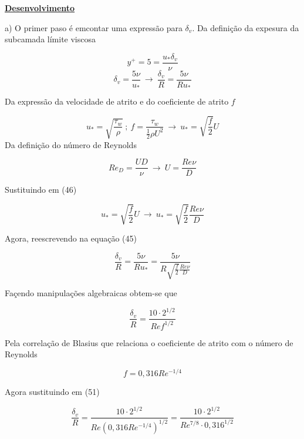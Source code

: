 \documentclass[12pt]{article}
\begin{document}
\textbf{\underline{Desenvolvimento}}

a) O primer paso é emcontar uma expressão para $\delta_v$. Da definição da expesura da subcamada límite viscosa

\begin{equation}
	y^+ = 5 = \frac{u_*\delta_v}{\nu}
\end{equation}
\begin{equation}
	\delta_v = \frac{5\nu}{u_*} \ \rightarrow \ \frac{\delta_v}{R} = \frac{5\nu}{Ru_*}
\end{equation}

Da expressão da velocidade de atrito e do coeficiente de atrito $f$

\begin{equation}
	u_*=\sqrt{\frac{\tau_w}{\rho}} \ ; \ f = \frac{\tau_w}{\frac{1}{2}\rho U^2} \ \rightarrow \ u_*=\sqrt{\frac{f}{2}}U
\end{equation}
Da definição do número de Reynolds

\begin{equation}
	Re_D = \frac{UD}{\nu} \ \rightarrow \ U= \frac{Re \nu}{D}
\end{equation}

Sustituindo em (46)

\begin{equation}
	u_*=\sqrt{\frac{f}{2}}U \ \rightarrow \  u_*=\sqrt{\frac{f}{2}} \frac{Re \nu}{D}
\end{equation}

Agora, reescrevendo na equação (45)

\begin{equation}
	\frac{\delta_v}{R} = \frac{5\nu}{Ru_*} = \frac{5\nu}{R\sqrt{\frac{f}{2}} \frac{Re \nu}{D}}
\end{equation}

Façendo manipulações algebraicas obtem-se que

\begin{equation}
	\frac{\delta_v}{R} = \frac{10 \cdot 2^{1/2}}{Re f^{1/2}}
\end{equation}

Pela correlação de Blasius que relaciona o coeficiente de atrito com o número de Reynolds

\begin{equation}
	f = 0,316 Re^{-1/4}
\end{equation}

Agora sustituindo em (51)

\begin{equation}
	\frac{\delta_v}{R} = \frac{10 \cdot 2^{1/2}}{Re (0,316 Re^{-1/4})^{1/2}} = \frac{10 \cdot 2^{1/2}}{Re^{7/8} \cdot 0,316^{1/2}}
\end{equation}
\end{document}
